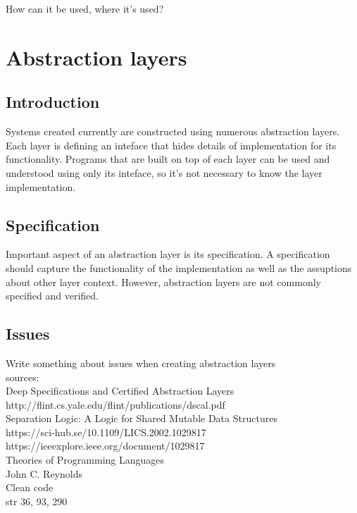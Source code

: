   {
    \color{red}
    How can it be used, where it's used?
  }

\section{Abstraction layers}
\subsection{Introduction}
Systems created currently are constructed using numerous abstraction layers. Each layer is defining an inteface that hides details of implementation for its functionality. Programs that are built on top of each layer can be used and understood using only its inteface, so it's not necessary to know the layer implementation.
\subsection{Specification}
Important aspect of an abstraction layer is its specification. A specification should capture the functionality of the implementation as well as the assuptions about other layer context. However, abstraction layers are not commonly specified and verified.
\subsection{Issues}
{
  \color{red}
  Write something about issues when creating abstraction layers\\
  
  sources: \\
  Deep Specifications and Certified Abstraction Layers \\
  http://flint.cs.yale.edu/flint/publications/dscal.pdf\\
  
  Separation Logic: A Logic for Shared Mutable Data Structures \\
  https://sci-hub.se/10.1109/LICS.2002.1029817\\
  https://ieeexplore.ieee.org/document/1029817\\
  
  Theories of Programming Languages\\
  John C. Reynolds\\
  
  Clean code\\
  str 36, 93, 290\\
}